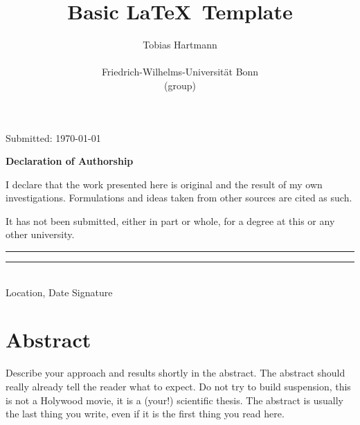 \documentclass[12pt, %
a4paper, %
twoside, %
openright, %
abstract=on, %
DIV=11,      %
BCOR=8mm]{scrbook} %
\begin{document}
\begin{titlepage}
\begin{center}
            \vfill

            {\large Submitted:\hspace{1cm} \today}

        \end{center}
    \end{titlepage}

    \pagestyle{headings}  %
    \title{Basic \LaTeX \, Template}
    \author{Tobias Hartmann\\ \begin{minipage}{8cm}\centering \small Friedrich-Wilhelms-Universität Bonn\\ \small (group)\end{minipage}}

    \vspace{4cm}

    \cleardoublepage
    \thispagestyle{empty}
    {\noindent%
        \huge{\textbf{\textsf{Declaration of Authorship}}}
    }
    \vspace{2cm}
    \begin{flushleft}
        \noindent%
        I declare that the work presented here is original and the result of my own investigations.
        Formulations and ideas taken from other sources are cited as such.

        It has not been submitted, either in part or whole, for a degree at this or any other university.
    \end{flushleft}

    \vspace{8cm}
    \noindent%
    \rule[1em]{8em}{0.5pt}  \hfill \rule[1em]{8em}{0.5pt}\\ %
    Location, Date \hfill Signature\\


    \cleardoublepage


    \chapter*{Abstract}
    \thispagestyle{empty}
    Describe your approach and results shortly in the abstract.
    The abstract should really already tell the reader what to expect.
    Do not try to  build suspension, this is not a Holywood  movie, it is a
    (your!) scientific thesis.  The abstract  is usually the last thing you
    write, even if it is the first thing you read here.
\end{document}
